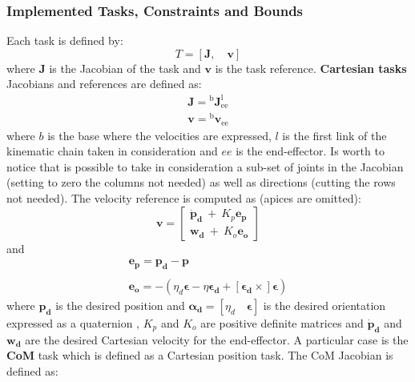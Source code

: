 \subsubsection{Implemented Tasks, Constraints and Bounds}
Each task is defined by:
\begin{equation}
    T = \left[ \mathbf{J}, \quad \mathbf{v} \right]
\end{equation}
where $\mathbf{J}$ is the Jacobian of the task and $\mathbf{v}$ is the task reference. \textbf{Cartesian tasks} Jacobians and references are defined as:
\begin{equation}
\begin{matrix}
\mathbf{J} = {^\text{b}\mathbf{J}^\text{l}_\text{ee}} \\ 
\mathbf{v} = {^\text{b}\mathbf{v}_\text{ee}}
\end{matrix}
\end{equation}
where $b$ is the base where the velocities are expressed, $l$ is the first link of the kinematic chain taken in consideration and $ee$ is the end-effector. Is worth to notice that is possible to take in consideration a sub-set of joints in the Jacobian (setting to zero the columns not needed) as well as directions (cutting the rows not needed). The velocity reference is computed as (apices are omitted):
\begin{equation}
\mathbf{v} = \begin{bmatrix}
\mathbf{\dot{p}_d}  \ + \ K_p\mathbf{e_p}\\ 
\mathbf{w_d}  \ + \ K_o\mathbf{e_o}
\end{bmatrix}
\end{equation}
and
\begin{equation}
\begin{array}{l}
\mathbf{e_p} = \mathbf{p_d} - \mathbf{p}
\\
\\
\mathbf{e_o} = -(\eta_d \boldsymbol{\epsilon} - \eta \boldsymbol{\epsilon_d} + [\boldsymbol{\epsilon_d}\times] \boldsymbol{\epsilon})
\label{cartesian_error}
\end{array}
\end{equation}
where $\mathbf{p_d}$ is the desired position and $\boldsymbol{\alpha_d} = [\eta_d \quad \boldsymbol{\epsilon}]$ is the desired orientation expressed as a quaternion \cite{Nakanishi:08}, $K_p$ and $K_o$ are positive definite matrices and $\mathbf{\dot{p}_d}$ and $\mathbf{w_d}$ are the desired Cartesian velocity for the end-effector.
A particular case is the \textbf{CoM} task which is defined as a Cartesian position task. The CoM Jacobian is defined as:
